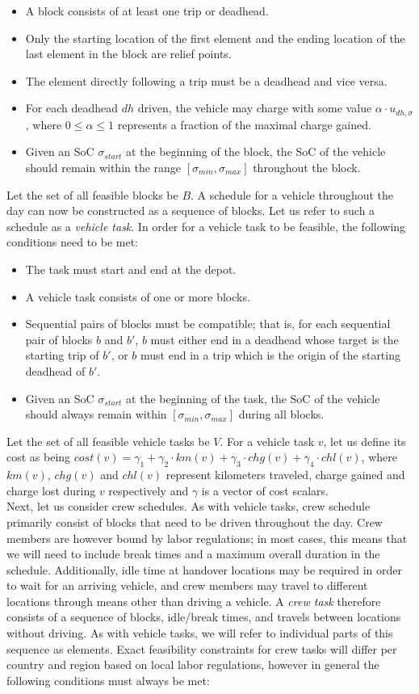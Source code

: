 \documentclass[]{article}
\begin{document}
\begin{itemize}
  \item A block consists of at least one trip or deadhead.
  \item Only the starting location of the first element and the ending location of the last element in the block are relief points.
  \item The element directly following a trip must be a deadhead and vice versa. 
  \item For each deadhead $dh$ driven, the vehicle may charge with some value $\alpha \cdot u_{dh,\sigma}$, where $0 \leq \alpha \leq 1$ represents a fraction of the maximal charge gained. 
  \item Given an SoC $\sigma_{start}$ at the beginning of the block, the SoC of the vehicle should remain within the range $[ \sigma_{min}, \sigma_{max} ]$ throughout the block.
\end{itemize}
Let the set of all feasible blocks be $B$. A schedule for a vehicle throughout the day can now be constructed as a sequence of blocks. Let us refer to such a schedule as a \textit{vehicle task}. In order for a vehicle task to be feasible, the following conditions need to be met:
\begin{itemize}
  \item The task must start and end at the depot. 
  \item A vehicle task consists of one or more blocks. 
  \item Sequential pairs of blocks must be compatible; that is, for each sequential pair of blocks $b$ and $b'$, $b$ must either end in a deadhead whose target is the starting trip of $b'$, or $b$ must end in a trip which is the origin of the starting deadhead of $b'$.
  \item Given an SoC $\sigma_{start}$ at the beginning of the task, the SoC of the vehicle should always remain within $[ \sigma_{min}, \sigma_{max} ]$ during all blocks.
\end{itemize}
Let the set of all feasible vehicle tasks be $V$. For a vehicle task $v$, let us define its cost as being $cost(v) = \gamma_1 + \gamma_2 \cdot km(v) + \gamma_3 \cdot chg(v) + \gamma_4 \cdot chl(v)$, where $km(v)$, $chg(v)$ and $chl(v)$ represent kilometers traveled, charge gained and charge lost during $v$ respectively and $\gamma$ is a vector of cost scalars. \\
Next, let us consider crew schedules. As with vehicle tasks, crew schedule primarily consist of blocks that need to be driven throughout the day. Crew members are however bound by labor regulations; in most cases, this means that we will need to include break times and a maximum overall duration in the schedule. Additionally, idle time at handover locations may be required in order to wait for an arriving vehicle, and crew members may travel to different locations through means other than driving a vehicle. A \textit{crew task} therefore consists of a sequence of blocks, idle/break times, and travels between locations without driving. As with vehicle tasks, we will refer to individual parts of this sequence as elements. Exact feasibility constraints for crew tasks will differ per country and region based on local labor regulations, however in general the following conditions must always be met: 
\end{document}

